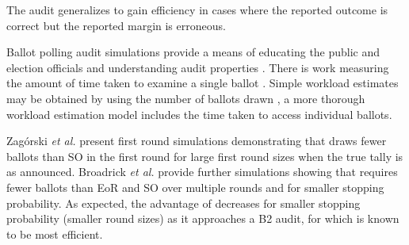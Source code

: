 The \ALPHA audit \cite{alpha} generalizes \BRAVO to gain efficiency in cases where the reported outcome is correct but the reported margin is erroneous.

 Ballot polling audit simulations provide a means of educating the public and election officials \cite{dice} and understanding audit properties \cite{mclaughlin_thesis,simulations_house, blom_IRV, DBLP:conf/evoteid/HuangRSTV20,bravo}. There is work measuring the amount of time taken to examine a single ballot \cite{RI-report}. 
Simple workload estimates may be obtained by using the number of ballots drawn \cite{bernoulli-ballot-polling}, a more thorough workload estimation model includes the time taken to access individual ballots\cite{bernhard-diss}. 

Zag\'{o}rski {\em et al.}  present first round simulations demonstrating that \Minerva draws fewer ballots than SO \BRAVO in the first round for large first round sizes when the true tally is as announced. Broadrick {\em et al.} provide further simulations showing that \Minerva requires fewer ballots than EoR and SO \BRAVO over multiple rounds and for smaller stopping probability. As expected, the advantage of \Minerva decreases for smaller stopping probability (smaller round sizes) as it approaches a B2 audit, 
for which \BRAVO is known to be most efficient. 


